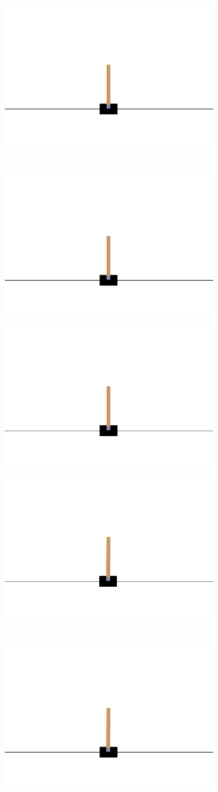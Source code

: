 \begin{figure}[H]
	\hfill
	\begin{subfigure}
		\centering
		\includegraphics[width=0.3\linewidth]{Images/frames/GA/6.png}
	\end{subfigure}
		\\
	\begin{subfigure}
		\centering
		\includegraphics[width=0.3\linewidth]{Images/frames/GA/7.png}
	\end{subfigure}
	\hfill
	\begin{subfigure}
		\centering
		\includegraphics[width=0.3\linewidth]{Images/frames/GA/8.png}
	\end{subfigure}
	\hfill
	\begin{subfigure}
		\centering
		\includegraphics[width=0.3\linewidth]{Images/frames/GA/9.png}
	\end{subfigure}
	\\
	\begin{subfigure}
		\centering
		\includegraphics[width=0.3\linewidth]{Images/frames/GA/10.png}
	\end{subfigure}

\end{figure}
